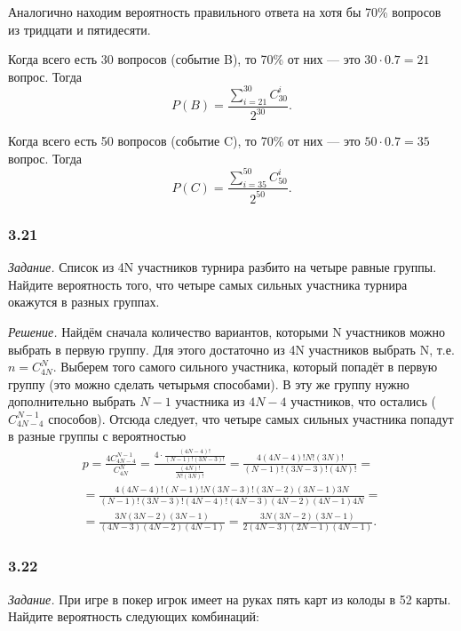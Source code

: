 \documentclass{book}
\begin{document}
Аналогично находим вероятность правильного ответа на хотя бы 70\% вопросов из тридцати и пятидесяти.

Когда всего есть 30 вопросов (событие B), то 70\% от них --- это $ 30 \cdot 0.7 = 21$ вопрос.
Тогда
$$ P \left( B \right) =
\frac{ \sum \limits_{i=21}^{30} C_{30}^i}{2^{30}}.$$

Когда всего есть 50 вопросов (событие C), то 70\% от них --- это $ 50 \cdot 0.7 = 35$ вопрос.
Тогда
$$ P \left( C \right) =
\frac{ \sum \limits_{i=35}^{50} C_{50}^i}{2^{50}}.$$

\subsubsection*{3.21}

\textit{Задание.} Список из 4N участников турнира разбито на четыре равные группы.
Найдите вероятность того, что четыре самых сильных участника турнира окажутся в разных группах. 

\textit{Решение.} Найдём сначала количество вариантов, которыми N участников можно выбрать в первую группу.
Для этого достаточно из 4N участников выбрать N, т.е. $ n = C_{4N}^N $.
Выберем того самого сильного участника, который попадёт в первую группу (это можно сделать четырьмя способами).
В эту же группу нужно дополнительно выбрать $ N - 1 $ участника из $ 4N - 4 $ участников, что остались ($ C_{ 4N - 4 }^{ N - 1 } $ способов).
Отсюда следует, что четыре самых сильных участника попадут в разные группы с вероятностью
\begin{equation*}
\begin{split}
p =
\frac{ 4C_{ 4N - 4 }^{ N - 1 } }{ C_{ 4N }^N } =
\frac{ 4 \cdot \frac{ (4N-4)! }{ ( N - 1 )!( 3 N - 3)! } }{ \frac{ (4N)! }{ N!(3N)! } } =
\frac{ 4(4N-4)!N!(3N)! }{ (N-1)!(3N-3)!(4N)! } = \\
= \frac{ 4(4N-4)!(N-1)!N(3N-3)!(3N-2)(3N-1)3N }{ (N-1)!(3N-3)!(4N-4)!(4N-3)(4N-2)(4N-1)4N } = \\
= \frac{ 3N(3N-2)(3N-1) }{ (4N-3)(4N-2)(4N-1) } =
\frac{ 3N(3N-2)(3N-1) }{ 2(4N-3)(2N-1)(4N-1) }.
\end{split}
\end{equation*}

\subsubsection*{3.22}

\textit{Задание.} При игре в покер игрок имеет на руках пять карт из колоды в 52 карты.
Найдите вероятность следующих комбинаций:
\end{document}
